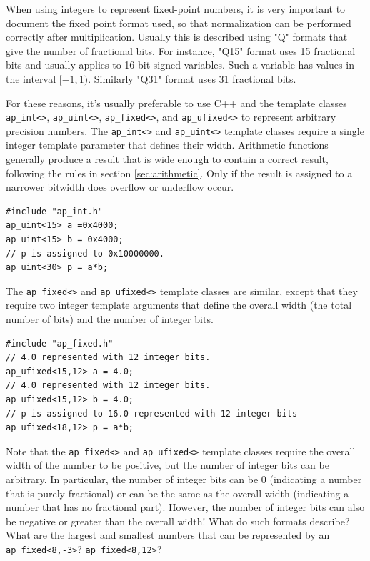 \begin{aside}
When using integers to represent fixed-point numbers, it is very important to document the fixed point format used, so that normalization can be performed correctly after multiplication.  Usually this is described using "Q" formats that give the number of fractional bits.  For instance, "Q15" format uses 15 fractional bits and usually applies to 16 bit signed variables.  Such a variable has values in the interval $[-1,1)$.  Similarly "Q31" format uses 31 fractional bits.
\end{aside}

For these reasons, it's usually preferable to use C++ and the \VHLS template classes \lstinline|ap_int<>|, \lstinline|ap_uint<>|, \lstinline|ap_fixed<>|, and \lstinline|ap_ufixed<>| to represent arbitrary precision numbers.  The \lstinline|ap_int<>| and \lstinline|ap_uint<>| template classes require a single integer template parameter that defines their width. Arithmetic functions generally produce a result that is wide enough to contain a correct result, following the rules in section \ref{sec:arithmetic}.
Only if the result is assigned to a narrower bitwidth does overflow or underflow occur.
\begin{lstlisting}
#include "ap_int.h"
ap_uint<15> a =0x4000;
ap_uint<15> b = 0x4000;
// p is assigned to 0x10000000.
ap_uint<30> p = a*b; 
\end{lstlisting}

The \lstinline|ap_fixed<>| and \lstinline|ap_ufixed<>| template classes are similar, except that they require two integer template arguments that define the overall width (the total number of bits) and the number of integer bits.
\begin{lstlisting}
#include "ap_fixed.h"
// 4.0 represented with 12 integer bits.
ap_ufixed<15,12> a = 4.0; 
// 4.0 represented with 12 integer bits.
ap_ufixed<15,12> b = 4.0; 
// p is assigned to 16.0 represented with 12 integer bits
ap_ufixed<18,12> p = a*b; 
\end{lstlisting}

\begin{exercise}
Note that the \lstinline|ap_fixed<>| and \lstinline|ap_ufixed<>| template classes require the overall width of the number to be positive, but the number of integer bits can be arbitrary.  In particular, the number of integer bits can be 0 (indicating a number that is purely fractional) or can be the same as the overall width (indicating a number that has no fractional part).  However, the number of integer bits can also be negative or greater than the overall width!  What do such formats describe?  What are the largest and smallest numbers that can be represented by an \lstinline|ap_fixed<8,-3>|? \lstinline|ap_fixed<8,12>|?
\end{exercise}

